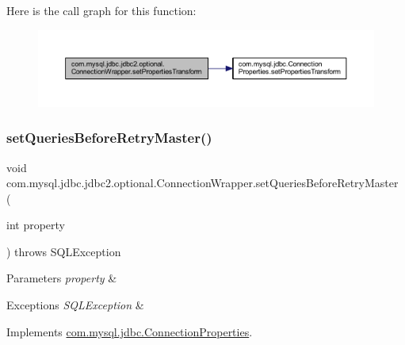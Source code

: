 Here is the call graph for this function\+:
\nopagebreak
\begin{figure}[H]
\begin{center}
\leavevmode
\includegraphics[width=350pt]{classcom_1_1mysql_1_1jdbc_1_1jdbc2_1_1optional_1_1_connection_wrapper_a6c9f8bd8652930ab22706c7c3cf23471_cgraph}
\end{center}
\end{figure}
\mbox{\label{classcom_1_1mysql_1_1jdbc_1_1jdbc2_1_1optional_1_1_connection_wrapper_a3a5da08b543633c1643a07d41696b7c7}} 
\subsubsection{\texorpdfstring{set\+Queries\+Before\+Retry\+Master()}{setQueriesBeforeRetryMaster()}}
{\footnotesize\ttfamily void com.\+mysql.\+jdbc.\+jdbc2.\+optional.\+Connection\+Wrapper.\+set\+Queries\+Before\+Retry\+Master (\begin{DoxyParamCaption}\item[{int}]{property }\end{DoxyParamCaption}) throws S\+Q\+L\+Exception}


\begin{DoxyParams}{Parameters}
{\em property} & \\
\hline
\end{DoxyParams}

\begin{DoxyExceptions}{Exceptions}
{\em S\+Q\+L\+Exception} & \\
\hline
\end{DoxyExceptions}


Implements \mbox{\hyperlink{interfacecom_1_1mysql_1_1jdbc_1_1_connection_properties_a957986bd12af4715d9b9bb097109a61b}{com.\+mysql.\+jdbc.\+Connection\+Properties}}.


